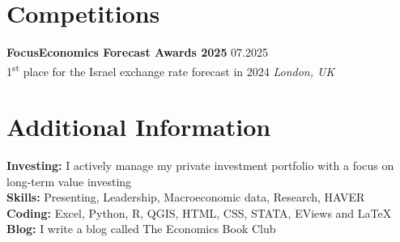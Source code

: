 \documentclass[11pt,a4paper]{article}
\begin{document}
\section{Competitions}

\textbf{FocusEconomics Forecast Awards 2025} \hfill 07.2025 \\
1\textsuperscript{st} place for the Israel exchange rate forecast in 2024 \hfill \textit{London, UK}

\section{Additional Information}

\textbf{Investing:} \quad I actively manage my private investment portfolio with a focus on long-term value investing \\
\textbf{Skills:} \quad\quad\quad Presenting, Leadership, Macroeconomic data, Research, HAVER \\
\textbf{Coding:} \quad\quad\; Excel, Python, R, QGIS, HTML, CSS, STATA, EViews and \LaTeX \\
\textbf{Blog:} \quad\quad\quad\; I write a blog called The Economics Book Club
\end{document}
